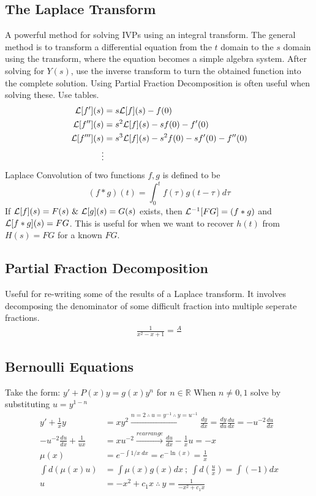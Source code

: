\subsection{The Laplace Transform}
    A powerful method for solving IVPs using an integral transform. The general method is to transform a differential equation from the $t$ domain to the $s$ domain using the transform, where the equation becomes a simple algebra system. After solving for $Y(s)$, use the inverse transform to turn the obtained function into the complete solution.  Using Partial Fraction Decomposition is often useful when solving these. Use tables.
    \begin{align*}
        \mathcal{L}[f'](s)&=s\mathcal{L}[f](s)-f(0)
        \\
        \mathcal{L}[f''](s)&=s^2\mathcal{L}[f](s)-sf(0)-f'(0)
        \\
        \mathcal{L}[f'''](s)&=s^3\mathcal{L}[f](s)-s^2f(0)-sf'(0)-f''(0)
        \\
        \vdots
    \end{align*}
    Laplace Convolution of two functions $f,g$ is defined to be 
    \[
    (f*g)(t)=\int_0^tf(\tau)g(t-\tau)d\tau
    \]
    If $\mathcal{L}[f](s)=F(s)~\&~\mathcal{L}[g](s)=G(s)$ exists, then $\mathcal{L}^{-1}[FG]=(f*g)$ and $\mathcal{L}[f*g](s)=FG$. This is useful for when we want to recover $h(t)$ from $H(s)=FG$ for a known $FG$.
\subsection{Partial Fraction Decomposition}
    Useful for re-writing some of the results of a Laplace transform. It involves decomposing the denominator of some difficult fraction into multiple seperate fractions. 
    \begin{align*}
        \frac{1}{x^2-x+1}=\frac{A}{}
    \end{align*}
\newpage
\subsection{Bernoulli Equations}
    Take the form: $y'+P(x)y=g(x)y^n$ for $n \in \mathbb{R}$ When $n \neq 0,1$ solve by substituting $u=y^{1-n}$
    \begin{align*}
        y'+\frac{1}{x}y&=xy^2\xrightarrow{n=2\ \therefore\ u=y^{-1}\ \therefore\ y=u^{-1}} \frac{dy}{dx}=\frac{dy}{du}\frac{du}{dx}=-u^{-2}\frac{du}{dx}\\
        -u^{-2}\frac{du}{dx}+\frac{1}{ux}&=xu^{-2}\xrightarrow{rearrange}\frac{du}{dx}-\frac{1}{x}u=-x\\
        \mu(x)&=e^{-\int 1/x\ dx}=e^{-\ln(x)}=\frac{1}{x}\\
        \int d(\mu(x)u)&=\int \mu(x)g(x)dx\ ;\ \int d\left(\frac{u}{x}\right)=\int (-1)dx\\
        u&=-x^2+c_1x\ \therefore\ \boxed{y=\frac{1}{-x^2+c_1x}}
        \end{align*}
